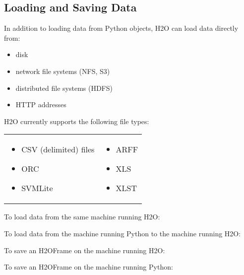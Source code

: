 {\subsection{Loading and Saving Data}
In addition to loading data from Python objects, H2O can load data directly from:
\begin{itemize}
\item disk
\item network file systems (NFS, S3)
\item distributed file systems (HDFS)
\item HTTP addresses
\end{itemize}

\newpage

 H2O currently supports the following file types:

\begin{frame}%

\begin{tabular}{p{5.5cm}p{5.5cm}}

\begin{itemize}
\item CSV (delimited) files
\item ORC
\item SVMLite
\end{itemize} &

\begin{itemize}
\item ARFF
\item XLS
\item XLST 
\end{itemize}

\end{tabular}
\end{frame}


To load data from the same machine running H2O:


To load data from the machine running Python to the machine running H2O:


To save an H2OFrame on the machine running H2O:


To save an H2OFrame on the machine running Python:


}
